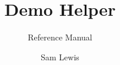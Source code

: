 \documentclass{technical-reference-manual}
\title{Demo Helper}
\subtitle{Reference Manual}
\author{Sam Lewis}
\begin{document}
	
	\graphicspath{ {./assets/} }
	
	\maketitle
	
	\tableofcontents
	\newpage
	
	
	\pagebreak
	
	\pagebreak
	
\end{document}
